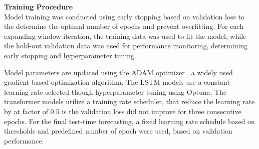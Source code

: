 \textbf{Training Procedure} \\ 
Model training was conducted using early stopping based on validation loss to the determine the optimal number of epochs and prevent overfitting. For each expanding window iteration, the training data was used to fit the model, while the hold-out validation data was used for performance monitoring, determining early stopping and hyperparameter tuning.  

Model parameters are updated using the ADAM optimizer \citep{kingma2014adam}, a widely used gradient-based optimization algorithm. The LSTM models use a constant learning rate selected though hyperparameter tuning using Optuna. The transformer models utilize a training rate scheduler, that reduce the learning rate by at factor of 0.5 is the validation loss did not improve for three consecutive epochs. For the final test-time forecasting, a fixed learning rate schedule based on thresholds and predefined number of epoch were used, based on validation performance. 












